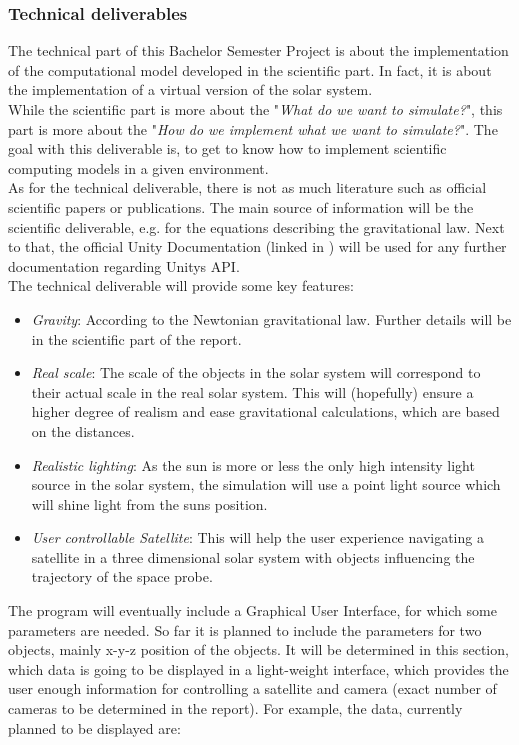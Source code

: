 \documentclass[conference,compsoc]{IEEEtran}
\begin{document}
\subsubsection{Technical deliverables}
The technical part of this Bachelor Semester Project is about the implementation of the computational model developed in the scientific part. In fact, it is about the implementation of a virtual version of the solar system. \\
While the scientific part is more about the "\emph{What do we want to simulate?}", this part is more about the "\emph{How do we implement what we want to simulate?}". The goal with this deliverable is, to get to know how to implement scientific computing models in a given environment. \\
As for the technical deliverable, there is not as much literature such as official scientific papers or publications. The main source of information will be the scientific deliverable, e.g. for the equations describing the gravitational law. Next to that, the official Unity Documentation (linked in \cite{UnityDoc}) will be used for any further documentation regarding Unitys API. \\ 
The technical deliverable will provide some key features:
\begin{itemize}
	\item \emph{Gravity}: According to the Newtonian gravitational law. Further details will be in the scientific part of the report.
	\item \emph{Real scale}: The scale of the objects in the solar system will correspond to their actual scale in the real solar system. This will (hopefully) ensure a higher degree of realism and ease gravitational calculations, which are based on the distances.
	\item \emph{Realistic lighting}: As the sun is more or less the only high intensity light source in the solar system, the simulation will use a point light source which will shine light from the suns position. 
	\item \emph{User controllable Satellite}: This will help the user experience navigating a satellite in a three dimensional solar system with objects influencing the trajectory of the space probe.
\end{itemize}
The program will eventually include a Graphical User Interface, for which some parameters are needed. So far it is planned to include the parameters for two objects, mainly x-y-z position of the objects. It will be determined in this section, which data is going to be displayed in a light-weight interface, which provides the user enough information for controlling a satellite and camera (exact number of cameras to be determined in the report). For example, the data, currently planned to be displayed are: 
\end{document}
